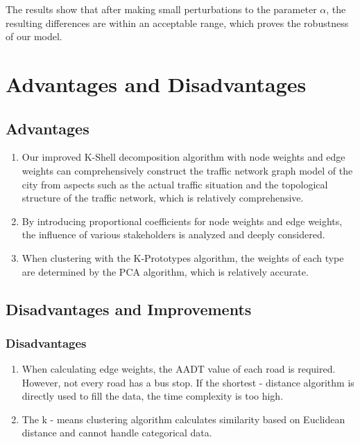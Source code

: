 \documentclass[12pt, a4paper, oneside]{ctexart}
\begin{document}
The results show that after making small perturbations to the parameter $\alpha$, the resulting differences are within an acceptable range, which proves the robustness of our model.

\section{Advantages and Disadvantages}
\subsection{Advantages}
\begin{enumerate}
    \item Our improved K-Shell decomposition algorithm with node weights and edge weights can comprehensively construct the traffic network graph model of the city from aspects such as the actual traffic situation and the topological structure of the traffic network, which is relatively comprehensive.
    \item By introducing proportional coefficients for node weights and edge weights, the influence of various stakeholders is analyzed and deeply considered.
    \item When clustering with the K-Prototypes algorithm, the weights of each type are determined by the PCA algorithm, which is relatively accurate.
\end{enumerate}

\subsection{Disadvantages and Improvements}
\subsubsection{Disadvantages}
\begin{enumerate}
    \item When calculating edge weights, the AADT value of each road is required. However, not every road has a bus stop. If the shortest - distance algorithm is directly used to fill the data, the time complexity is too high.
    \item The k - means clustering algorithm calculates similarity based on Euclidean distance and cannot handle categorical data.
\end{enumerate}
\end{document}
